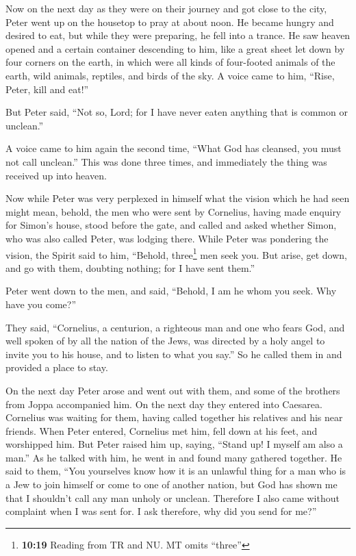  Now on the next day as they were on their journey and got
close to the city, Peter went up on the housetop to pray at about noon.
 He became hungry and desired to eat, but while they were
preparing, he fell into a trance.  He saw heaven opened
and a certain container descending to him, like a great sheet let down
by four corners on the earth,  in which were all kinds of
four-footed animals of the earth, wild animals, reptiles, and birds of
the sky.  A voice came to him, ``Rise, Peter, kill and
eat!''

 But Peter said, ``Not so, Lord; for I have never eaten
anything that is common or unclean.''

 A voice came to him again the second time, ``What God
has cleansed, you must not call unclean.''  This was done
three times, and immediately the thing was received up into heaven.

 Now while Peter was very perplexed in himself what the
vision which he had seen might mean, behold, the men who were sent by
Cornelius, having made enquiry for Simon's house, stood before the gate,
 and called and asked whether Simon, who was also called
Peter, was lodging there.  While Peter was pondering the
vision, the Spirit said to him, ``Behold, three\footnote{\textbf{10:19}
  Reading from TR and NU. MT omits ``three''} men seek you.
 But arise, get down, and go with them, doubting nothing;
for I have sent them.''

 Peter went down to the men, and said, ``Behold, I am he
whom you seek. Why have you come?''

 They said, ``Cornelius, a centurion, a righteous man and
one who fears God, and well spoken of by all the nation of the Jews, was
directed by a holy angel to invite you to his house, and to listen to
what you say.''  So he called them in and provided a
place to stay.

On the next day Peter arose and went out with them, and some of the
brothers from Joppa accompanied him.  On the next day
they entered into Caesarea. Cornelius was waiting for them, having
called together his relatives and his near friends.  When
Peter entered, Cornelius met him, fell down at his feet, and worshipped
him.  But Peter raised him up, saying, ``Stand up! I
myself am also a man.''  As he talked with him, he went
in and found many gathered together.  He said to them,
``You yourselves know how it is an unlawful thing for a man who is a Jew
to join himself or come to one of another nation, but God has shown me
that I shouldn't call any man unholy or unclean. 
Therefore I also came without complaint when I was sent for. I ask
therefore, why did you send for me?''

